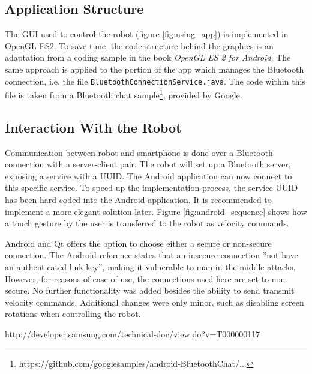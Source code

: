 \subsection{Application Structure}


The \ac{GUI} used to control the robot (figure \ref{fig:using_app}) is implemented in OpenGL ES2. To save time, the code structure behind the graphics is an adaptation from a coding sample in the book \textit{OpenGL ES 2 for Android}\cite{brothaler2013opengl}. The same approach is applied to the portion of the app which manages the Bluetooth connection, i.e. the file \texttt{BluetoothConnectionService.java}. The code within this file is taken from a Bluetooth chat sample\footnote{https://github.com/googlesamples/android-BluetoothChat/...}, provided by Google. 

\subsection{Interaction With the Robot}

Communication between robot and smartphone is done over a Bluetooth connection with a server-client pair. The robot will set up a Bluetooth server, exposing a service with a \ac{UUID}. The Android application can now connect to this specific service. To speed up the implementation process, the service \ac{UUID} has been hard coded into the Android application. It is recommended to implement a more elegant solution later. Figure \ref{fig:android_sequence} shows how a touch gesture by the user is transferred to the robot as velocity commands. 

Android and Qt offers the option to choose either a secure or non-secure connection. The Android reference states that an insecure connection ''not have an authenticated link key''\cite{android_bt_reference}, making it vulnerable to man-in-the-middle attacks. However, for reasons of ease of use, the connections used here are set to non-secure. No further functionality was added besides the ability to send transmit velocity commands. Additional changes were only minor, such as disabling screen rotations when controlling the robot. 

http://developer.samsung.com/technical-doc/view.do?v=T000000117




